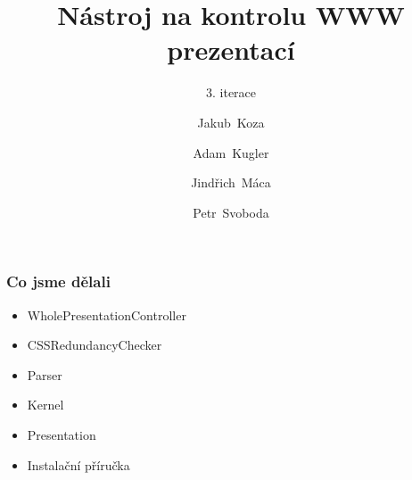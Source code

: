 \documentclass{beamer}
\begin{document}
\title [NKWP]{Nástroj na kontrolu WWW prezentací}
\author[J.~ Koza, A.~ Kugler, J.~Máca, P.~Svoboda]{Jakub~Koza \and Adam~Kugler \and Jindřich~Máca \and Petr~Svoboda}

\subtitle{3. iterace}
\frame{\titlepage}
\begin{frame}[allowframebreaks]\frametitle{Co jsme dělali}
   \begin{itemize}
		\item WholePresentationController
		\item CSSRedundancyChecker
		\item Parser
		\item Kernel
		\item Presentation
		\item Instalační příručka
   \end{itemize}
\end{frame}
\end{document}

